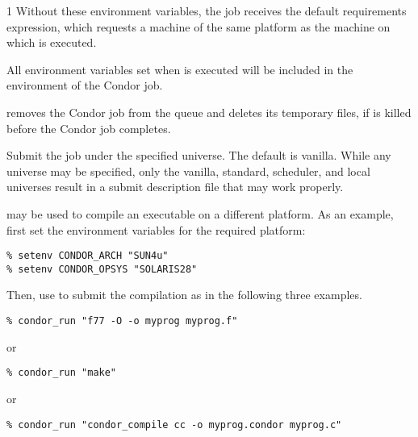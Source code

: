 \begin{ManPage}{\label{man-condor-run}}{1}
Without these environment variables, 
the job receives the default requirements expression, which
requests a machine of the same platform as
the machine on which  is executed.

All environment variables set when  is executed will be
included in the environment of the Condor job.

 removes the Condor job from the queue and
deletes its temporary files, if  is killed before the 
Condor job completes.

\begin{Options}

  {Submit the job under the specified universe. The default is vanilla.
  While any universe may be specified, only the vanilla, standard,
  scheduler, and local universes result in a submit description
  file that may work properly.}

\end{Options}

\Examples

 may be used to compile an executable on
a different platform.
As an example, first set the environment variables for
the required platform:

\begin{verbatim}
% setenv CONDOR_ARCH "SUN4u"
% setenv CONDOR_OPSYS "SOLARIS28"
\end{verbatim}

Then, use  to submit the compilation as in the
following three examples.
\begin{verbatim}
% condor_run "f77 -O -o myprog myprog.f"
\end{verbatim}
or
\begin{verbatim}
% condor_run "make"
\end{verbatim}
or
\begin{verbatim}
% condor_run "condor_compile cc -o myprog.condor myprog.c"
\end{verbatim}


\Files


\end{ManPage}
